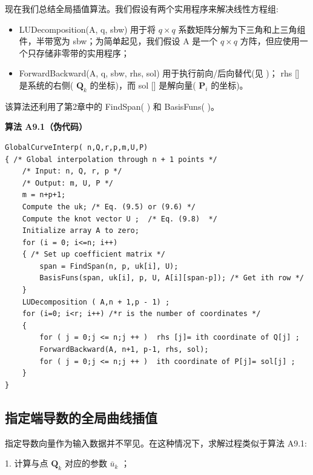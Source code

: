 \documentclass[../main.tex]{subfiles}
\begin{document}
现在我们总结全局插值算法。我们假设有两个实用程序来解决线性方程组:

\begin{itemize}
\item LUDecomposition(A, q, sbw) 用于将 \(q \times  q\) 系数矩阵分解为下三角和上三角组件，半带宽为 sbw；为简单起见，我们假设 \(\mathrm{A}\) 是一个 \(q \times  q\) 方阵，但应使用一个只存储非零带的实用程序；
\end{itemize}

\begin{itemize}
\item ForwardBackward(A, q, sbw, rhs, sol) 用于执行前向/后向替代(见 \cite{Pres88})； rhs [] 是系统的右侧( \({\mathbf{Q}}_{k}\) 的坐标)，而 sol [] 是解向量( \({\mathbf{P}}_{i}\) 的坐标)。
\end{itemize}

该算法还利用了第2章中的 FindSpan( ) 和 BasisFuns( )。

\par\medskip\noindent\textbf{算法 A9.1（伪代码）}\par
\begin{verbatim}
GlobalCurveInterp( n,Q,r,p,m,U,P)
{ /* Global interpolation through n + 1 points */
    /* Input: n, Q, r, p */
    /* Output: m, U, P */
    m = n+p+1;
    Compute the uk; /* Eq. (9.5) or (9.6) */
    Compute the knot vector U ;  /* Eq. (9.8)  */
    Initialize array A to zero;
    for (i = 0; i<=n; i++)
    { /* Set up coefficient matrix */
        span = FindSpan(n, p, uk[i], U);
        BasisFuns(span, uk[i], p, U, A[i][span-p]); /* Get ith row */
    }
    LUDecomposition ( A,n + 1,p - 1) ;
    for (i=0; i<r; i++) /*r is the number of coordinates */
    {
        for ( j = 0;j <= n;j ++ )  rhs [j]= ith coordinate of Q[j] ;
        ForwardBackward(A, n+1, p-1, rhs, sol);
        for ( j = 0;j <= n;j ++ )  ith coordinate of P[j]= sol[j] ;
    }
}
\end{verbatim}



\subsection{指定端导数的全局曲线插值}

指定导数向量作为输入数据并不罕见。在这种情况下，求解过程类似于算法 A9.1:

1. 计算与点 \({\mathbf{Q}}_{k}\) 对应的参数 \({\bar{u}}_{k}\) ；
\end{document}
